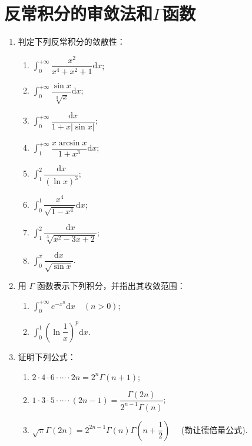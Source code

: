 
\section{反常积分的审敛法和$\Gamma$函数}

\begin{enumerate}\setlength{\itemsep}{7pt}
    \item 判定下列反常积分的敛散性：
    \begin{enumerate}[(1)]\setlength{\itemsep}{10pt}\setlength{\topsep}{15pt}
        \item $\displaystyle \int_{0}^{+\infty}\dfrac{x^2}{x^4+x^2+1}\text{d}x$;
        \item $\displaystyle \int_{0}^{+\infty}\dfrac{\sin x}{\sqrt[3]{x}}\text{d}x$;
        \item $\displaystyle \int_{0}^{+\infty}\dfrac{\text{d}x}{1+x|\sin x|}$;
        \item $\displaystyle \int_{1}^{+\infty}\dfrac{x\arcsin x}{1+x^3}\text{d}x$;
        \item $\displaystyle \int_{1}^{2}\dfrac{\text{d}x}{(\ln x)^3}$;
        \item $\displaystyle \int_{0}^{1}\dfrac{x^4}{\sqrt{1-x^4}}\text{d}x$;
        \item $\displaystyle \int_{1}^{2}\dfrac{\text{d}x}{\sqrt[3]{x^2-3x+2}}$;
        \item $\displaystyle \int_{0}^{\pi}\dfrac{\text{d}x}{\sqrt{\sin x}}$.
    \end{enumerate}

    \item 用 $\Gamma$ 函数表示下列积分，并指出其收敛范围：
    
    \begin{enumerate}[(1)]\setlength{\itemsep}{10pt}\setlength{\topsep}{15pt}
        \item $\displaystyle \int_{0}^{+\infty}e^{-x^n}\text{d}x\quad(n>0)$;
        \item $\displaystyle \int_0^1\left(\ln\dfrac{1}{x}\right)^p\text{d}x$.
    \end{enumerate}

    \item 证明下列公式：
    
    \begin{enumerate}[(1)]\setlength{\itemsep}{10pt}\setlength{\topsep}{15pt}
        \item $2\cdot4\cdot6\cdot\cdots\cdot2n=2^n\Gamma(n+1)$;
        \item $1\cdot3\cdot5\cdot\cdots\cdot(2n-1)=\dfrac{\Gamma(2n)}{2^{n-1}\Gamma(n)}$;
        \item $\sqrt{\pi}\Gamma(2n)=2^{2n-1}\Gamma(n)\Gamma\left(n+\dfrac{1}{2}\right)\quad$ (勒让德倍量公式).
    \end{enumerate}
\end{enumerate}


